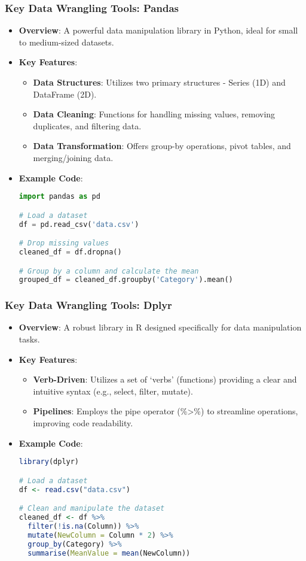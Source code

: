 \documentclass[aspectratio=169]{beamer}
\begin{document}
\begin{frame}[fragile]
    \frametitle{Key Data Wrangling Tools: Pandas}
    \begin{itemize}
        \item \textbf{Overview}: A powerful data manipulation library in Python, ideal for small to medium-sized datasets.
        \item \textbf{Key Features}:
        \begin{itemize}
            \item \textbf{Data Structures}: Utilizes two primary structures - Series (1D) and DataFrame (2D).
            \item \textbf{Data Cleaning}: Functions for handling missing values, removing duplicates, and filtering data.
            \item \textbf{Data Transformation}: Offers group-by operations, pivot tables, and merging/joining data.
        \end{itemize}
        \item \textbf{Example Code}:
        \begin{lstlisting}[language=Python]
import pandas as pd

# Load a dataset
df = pd.read_csv('data.csv')

# Drop missing values
cleaned_df = df.dropna()

# Group by a column and calculate the mean
grouped_df = cleaned_df.groupby('Category').mean()
        \end{lstlisting}
    \end{itemize}
\end{frame}

\begin{frame}[fragile]
    \frametitle{Key Data Wrangling Tools: Dplyr}
    \begin{itemize}
        \item \textbf{Overview}: A robust library in R designed specifically for data manipulation tasks.
        \item \textbf{Key Features}:
        \begin{itemize}
            \item \textbf{Verb-Driven}: Utilizes a set of ‘verbs’ (functions) providing a clear and intuitive syntax (e.g., select, filter, mutate).
            \item \textbf{Pipelines}: Employs the pipe operator (\%>\%) to streamline operations, improving code readability.
        \end{itemize}
        \item \textbf{Example Code}:
        \begin{lstlisting}[language=R]
library(dplyr)

# Load a dataset
df <- read.csv("data.csv")

# Clean and manipulate the dataset
cleaned_df <- df %>%
  filter(!is.na(Column)) %>%
  mutate(NewColumn = Column * 2) %>%
  group_by(Category) %>%
  summarise(MeanValue = mean(NewColumn))
        \end{lstlisting}
    \end{itemize}
\end{frame}
\end{document}
